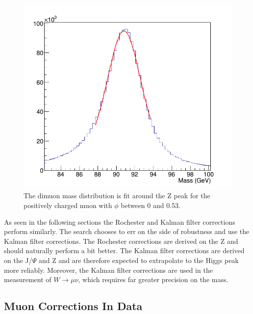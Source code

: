 \begin{figure}[!h]
  \centering
  \includegraphics[width=0.55\linewidth]{images/muon_calib/voigt_fit_z_example_w_fit.png}
  \caption[An example fit used for the dimuon mass calibrations.]
   {The dimuon mass distribution is fit around the Z peak for the positively charged muon with $\phi$ between 0 and 0.53.}
  \label{fig:voigt_fit_example}
\end{figure}

As seen in the following sections the Rochester and Kalman filter corrections perform similarly. The search chooses to err on the side of robustness and use the Kalman filter corrections. The Rochester corrections are derived on the Z and should naturally perform a bit better. The Kalman filter corrections are derived on the J/$\Psi$ and Z and are therefore expected to extrapolate to the Higgs peak more reliably. Moreover, the Kalman filter corrections are used in the measurement of $W\rightarrow\mu\nu$, which requires far greater precision on the mass.    

\subsection{Muon Corrections In Data}

